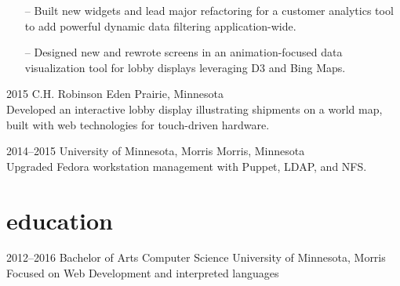 \documentclass[]{cv-style} %
\begin{document}
\begin{entrylist}
{
\begin{itemize}
    \item[--] Built new widgets and lead major refactoring for a customer analytics tool to add powerful dynamic data filtering application-wide.
    \item[--] Designed new and rewrote screens in an animation-focused data visualization tool for lobby displays leveraging D3 and Bing Maps.
\end{itemize}}


\entry
{2015}
{C.H. Robinson}
{Eden Prairie, Minnesota}
{ \\
Developed an interactive lobby display illustrating shipments on a world map, built with web technologies for touch-driven hardware.}


\entry
{2014--2015}
{University of Minnesota, Morris}
{Morris, Minnesota}
{ \\
Upgraded Fedora workstation management with Puppet, LDAP, and NFS.}


\end{entrylist}


\section{education}

\begin{entrylist}


\entry
{2012--2016}
{Bachelor of Arts {\normalfont Computer Science}}
{University of Minnesota, Morris}
{\small{Focused on Web Development and interpreted languages}}


\end{entrylist}

\end{document}
